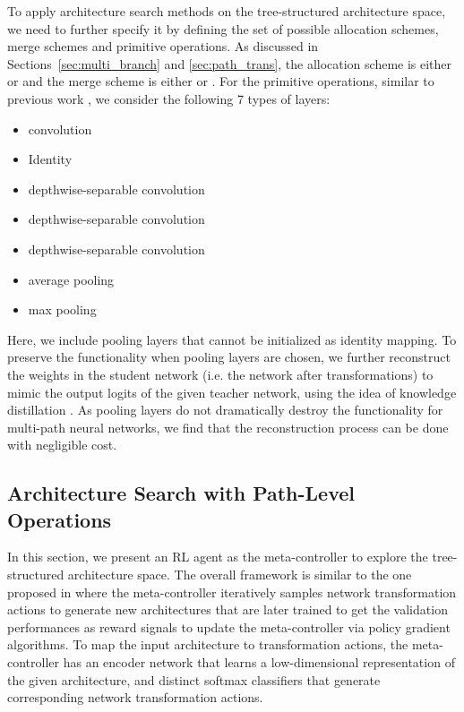 \documentclass{article}
\begin{document}
To apply architecture search methods on the tree-structured architecture space, we need to further specify it by defining the set of possible allocation schemes, merge schemes and primitive operations. As discussed in Sections~\ref{sec:multi_branch} and \ref{sec:path_trans}, the allocation scheme is either  or  and the merge scheme is either  or . For the primitive operations, similar to previous work \cite{zoph2017learning,liu2017hierarchical}, we consider the following 7 types of layers:
{\small
\begin{itemize}
	\setlength\itemsep{0.pt}
	\item  convolution
	\item Identity
	\item  depthwise-separable convolution 
	\item  depthwise-separable convolution
	\item  depthwise-separable convolution
    \item  average pooling
    \item  max pooling
\end{itemize}
}
Here, we include pooling layers that cannot be initialized as identity mapping. To preserve the functionality when pooling layers are chosen, we further reconstruct the weights in the student network (i.e. the network after transformations) to mimic the output logits of the given teacher network, using the idea of knowledge distillation \cite{hinton2015distilling}. As pooling layers do not dramatically destroy the functionality for multi-path neural networks, we find that the reconstruction process can be done with negligible cost. 

\subsection{Architecture Search with Path-Level Operations}\label{sec:arch_search_method}
In this section, we present an RL agent as the meta-controller to explore the tree-structured architecture space. The overall framework is similar to the one proposed in \citet{cai2018efficient} where the meta-controller iteratively samples network transformation actions to generate new architectures that are later trained to get the validation performances as reward signals to update the meta-controller via policy gradient algorithms.
To map the input architecture to transformation actions, the meta-controller has an encoder network that learns a low-dimensional representation of the given architecture, and distinct softmax classifiers that generate corresponding network transformation actions. 
\end{document}
